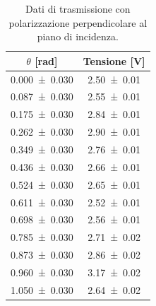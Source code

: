 \documentclass[a4paper]{article}
\begin{document}
\begin{table}[htbp]
\centering
\caption{Dati di trasmissione con polarizzazione perpendicolare al piano di incidenza.}
\label{tab:brewster_perp}
\begin{tabular}{|c|c|}
\hline
$\theta$ [\si{\radian}] & Tensione [\si{\volt}] \\\hline\hline
\num{0.000 \pm 0.030} & \num{2.50 \pm 0.01} \\
\num{0.087 \pm 0.030} & \num{2.55 \pm 0.01} \\
\num{0.175 \pm 0.030} & \num{2.84 \pm 0.01} \\
\num{0.262 \pm 0.030} & \num{2.90 \pm 0.01} \\
\num{0.349 \pm 0.030} & \num{2.76 \pm 0.01} \\
\num{0.436 \pm 0.030} & \num{2.66 \pm 0.01} \\
\num{0.524 \pm 0.030} & \num{2.65 \pm 0.01} \\
\num{0.611 \pm 0.030} & \num{2.52 \pm 0.01} \\
\num{0.698 \pm 0.030} & \num{2.56 \pm 0.01} \\
\num{0.785 \pm 0.030} & \num{2.71 \pm 0.02} \\
\num{0.873 \pm 0.030} & \num{2.86 \pm 0.02} \\
\num{0.960 \pm 0.030} & \num{3.17 \pm 0.02} \\
\num{1.050 \pm 0.030} & \num{2.64 \pm 0.02} \\
\hline
\end{tabular}
\end{table}
\end{document}
